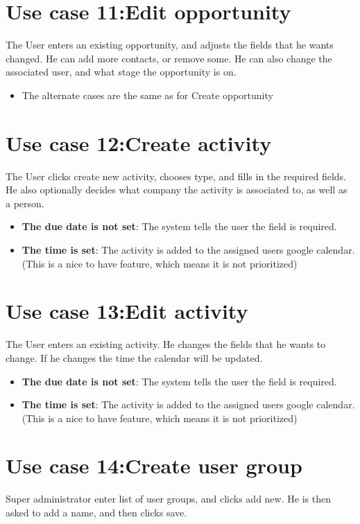 \section{Use case 11:Edit opportunity }
The User enters an existing opportunity, and adjusts the fields that he wants changed. He can add more contacts, or remove some. He can also change the associated user, and what stage the opportunity is on.

\begin{itemize}
  \item The alternate cases are the same as for Create opportunity
\end{itemize}

\section{Use case 12:Create activity }
The User clicks create new activity, chooses type, and fills in the required fields. He also optionally decides what company the activity is associated to, as well as a person.

\begin{itemize}
  \item \textbf{The due date is not set}: The system tells the user the field is required.
  \item \textbf{The time is set}: The activity is added to the assigned users google calendar. (This is a nice to have feature, which means it is not prioritized)
\end{itemize}

\section{Use case 13:Edit activity }
The User enters an existing activity. He changes the fields that he wants to change. If he changes the time the calendar will be updated.

\begin{itemize}
  \item \textbf{The due date is not set}: The system tells the user the field is required.
  \item \textbf{The time is set}: The activity is added to the assigned users google calendar. (This is a nice to have feature, which means it is not prioritized)
\end{itemize}

\section{Use case 14:Create user group }
Super administrator enter list of user groups, and clicks add new. He is then asked to add a name, and then clicks save.

